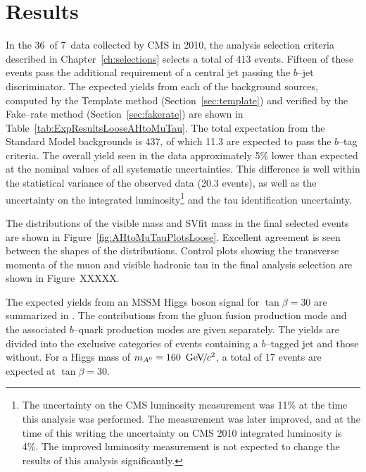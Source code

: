 \ifx\master\undefined\fi
\chapter{Results}
\label{ch:results}

In the 36~\pbinv of 7~\TeV data collected by CMS in 2010, the analysis selection
criteria described in Chapter~\ref{ch:selections} selects a total of 413 events.
Fifteen of these events pass the additional requirement of a central jet passing
the $b$--jet discriminator.  The expected yields from each of the background
sources, computed by the Template method (Section~\ref{sec:template}) and
verified by the Fake--rate method (Section~\ref{sec:fakerate}) are shown in
Table~\ref{tab:ExpResultsLooseAHtoMuTau}.  The total expectation from the
Standard Model backgrounds is 437, of which 11.3 are expected to pass the
$b$--tag criteria.  The overall yield seen in the data approximately 5\% lower
than expected at the nominal values of all systematic uncertainties.  This
difference is well within the statistical variance of the observed data (20.3
events), as well as the uncertainty on the integrated luminosity\footnote{The
uncertainty on the CMS luminosity measurement was 11\% at the time this analysis
was performed. The measurement was later improved, and at the time of this
writing the uncertainty on CMS 2010 integrated luminosity is 4\%. The improved
luminosity measurement is not expected to change the results of this analysis
significantly.}  and the tau identification uncertainty.

The distributions of the visible mass and SVfit mass in the final selected
events are shown in Figure~\ref{fig:AHtoMuTauPlotsLoose}.  Excellent
agreement is seen between the shapes of the distributions.   Control plots
showing the transverse
momenta of the muon and visible hadronic tau in the final analysis selection are
shown in  Figure~XXXXX.

The expected yields from an MSSM Higgs boson signal for \mbox{$\tan\beta = 30$}
are summarized in \label{tab:SignalExpResultsLooseAHtoMuTau}.  The contributions
from the gluon fusion production mode and the associated $b$--quark production
modes are given separately.  The yields are divided into the exclusive
categories of events containing a $b$--tagged jet and those without.  For a
Higgs mass of $m_{A^0} = 160~{\,\text{Ge\hspace{-.08em}V\hspace{-0.16em}/\hspace{-0.08em}}c^\text{2}}$, a total of 17 events are expected at
$\tan\beta = 30$.

